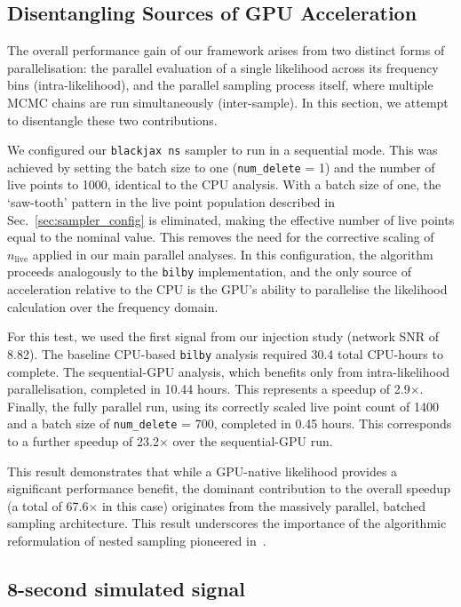 \documentclass[fleqn,usenatbib]{mnras}
\begin{document}
\subsection{Disentangling Sources of GPU Acceleration}
\label{sec:disentangling_acceleration}

The overall performance gain of our framework arises from two distinct
forms of parallelisation: the parallel evaluation of a single
likelihood across its frequency bins (intra-likelihood), and the
parallel sampling process itself, where multiple MCMC chains are run
simultaneously (inter-sample). In this section, we attempt to disentangle
these two contributions.

We configured our \texttt{blackjax ns} sampler to run in a sequential
mode. This was achieved by setting the batch size to one
(\texttt{num\_delete} = 1) and the number of live points to 1000,
identical to the CPU analysis. With a batch size of one, the
`saw-tooth' pattern in the live point population described in
Sec.~\ref{sec:sampler_config} is eliminated, making the effective
number of live points equal to the nominal value. This removes the need
for the corrective scaling of $n_{\text{live}}$ applied in our main
parallel analyses. In this configuration, the algorithm proceeds
analogously to the \texttt{bilby} implementation, and the only source of
acceleration relative to the CPU is the GPU's ability to parallelise the
likelihood calculation over the frequency domain.

For this test, we used the first signal from our injection study (network
SNR of 8.82). The baseline CPU-based \texttt{bilby} analysis required
30.4 total CPU-hours to complete. The sequential-GPU analysis, which
benefits only from intra-likelihood parallelisation, completed in
10.44 hours. This represents a speedup of 2.9$\times$. Finally, the
fully parallel run, using its correctly scaled live point count of 1400
and a batch size of \texttt{num\_delete} = 700, completed in 0.45 hours.
This corresponds to a further speedup of 23.2$\times$ over the
sequential-GPU run.

This result demonstrates that while a GPU-native likelihood provides
a significant performance benefit, the dominant contribution to the
overall speedup (a total of 67.6$\times$ in this case) originates from the
massively parallel, batched sampling architecture. This result
underscores the importance of the algorithmic reformulation 
of nested sampling pioneered in~\cite{yallup2025nested}.


\subsection{8-second simulated signal}
\label{sec:8s_simulated_signal}
\end{document}
